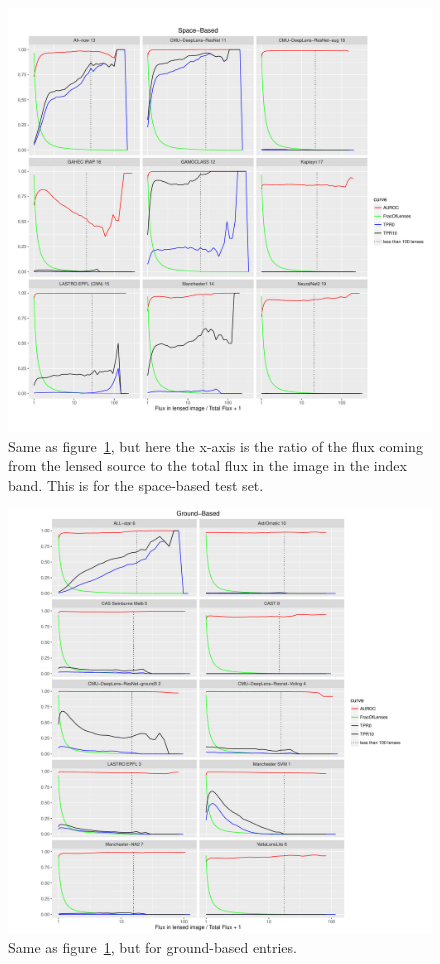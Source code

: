 \documentclass{aa}
\begin{document}
\begin{figure}
 \includegraphics[width=2\columnwidth]{figures/flux_contrast_space.pdf}
  \caption{Same as figure~\ref{fig:flux_contrast_space}, but here the x-axis is the ratio of the flux coming from the lensed source to the total flux in the image in the index band.  This is for the space-based test set.}
 \label{fig:flux_contrast_space}
\end{figure}

\begin{figure}
 \includegraphics[width=2\columnwidth]{figures/flux_contrast_ground.pdf}
 \caption{Same as figure~\ref{fig:flux_contrast_space}, but for ground-based entries.}
 \label{fig:flux_contrast_ground}
\end{figure}
\end{document}
